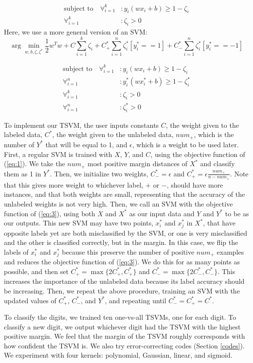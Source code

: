 \documentclass[11pt]{article}
\begin{document}
\begin{align*}
\textrm{subject to}\quad \forall_{i=1}^k&: y_i(wx_i+b)\geq 1-\zeta_i \\
\forall_{i=1}^k&: \zeta_i>0
\end{align*}
Here, we use a more general version of an SVM:
\begin{equation}\label{eq:3}
\arg\min_{w, b, \zeta,\zeta^*} \frac{1}{2}w^Tw+C\sum_{i=1}^k\zeta_i+C^*_+\sum_{i=1}^n\zeta^*_i[y^*_i == 1]+C^*_-\sum_{i=1}^n\zeta^*_i[y^*_i == -1]
\end{equation}

\begin{align*}
\textrm{subject to}\quad \forall_{i=1}^k&: y_i(wx_i+b)\geq 1-\zeta_i \\
\forall_{i=1}^n&: y^*_i(wx^*_i+b)\geq 1-\zeta^*_i \\
\forall_{i=1}^k&: \zeta_i>0 \\
\forall_{i=1}^n&: \zeta^*_i>0
\end{align*}

To implement our TSVM, the user inputs constants $C$, the weight given to the labeled data, $C^*$, the weight given to the unlabeled data, $num_+$, which is the number of $Y^*$ that will be equal to 1, and $\epsilon$, which is a weight to be used later. First, a regular SVM is trained with $X$, $Y$, and $C$, using the objective function of (\ref{eq:1}). We take the $num_+$ most positive margin distances of $X^*$ and classify them as 1 in $Y^*$. Then, we initialize two weights, $C^*_- = \epsilon$ and $C^*_+ = \epsilon\frac{num_+}{n-num_+}$. Note that this gives more weight to whichever label, $+$ or $-$, should have more instances, and that both weights are small, representing that the accuracy of the unlabeled weights is not very high. Then, we call an SVM with the objective function of (\ref{eq:3}), using both $X$ and $X^*$ as our input data and $Y$ and $Y^*$ to be as our outputs. This new SVM may have two points, $x^*_i$ and $x^*_j$ in $X^*$, that have opposite labels yet are both misclassified by the SVM, or one is very misclassified and the other is classified correctly, but in the margin. In this case, we flip the labels of $x^*_i$ and $x^*_j$ because this preserve the number of positive $num_+$ examples and reduces the objective function of (\ref{eq:3}). We do this for as many points as possible, and then set $C^*_+ = \max\{2C^*_+, C^*_+\}$ and $C^*_- = \max\{2C^*_-, C^*_-\}$. This increases the importance of the unlabeled data because its label accuracy should be increasing. Then, we repeat the above procedure, training an SVM with the updated values of $C^*_+$, $C^*_-$, and $Y^*$, and repeating until $C^*_- = C^*_+ = C^*$.\par
To classify the digits, we trained ten one-vs-all TSVMs, one for each digit. To classify a new digit, we output whichever digit had the TSVM with the highest positive margin. We feel that the margin of the TSVM roughly corresponds with how confident the TSVM is. We also try error-correcting codes (Section \ref{codes}). We experiment with four kernels: polynomial, Gaussian, linear, and sigmoid.
\end{document}
